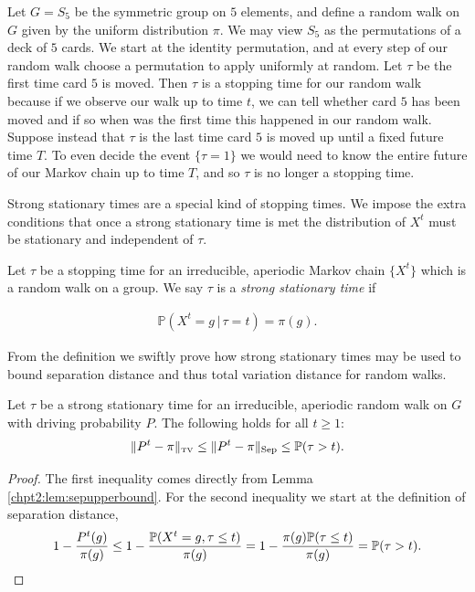 \documentclass[11pt]{report}
\begin{document}
\begin{example}
	Let $G = S_{5}$ be the symmetric group on $5$ elements, and define a random walk on  $G$ given by the uniform distribution $\pi$.  We may view $S_{5}$ as the permutations of a deck of $5$ cards. We start at the identity permutation, and at every step of our random walk choose a permutation to apply uniformly at random. 
	Let $\tau$ be the first time card $5$ is moved. Then 
	$\tau$ is a stopping time for our random walk because if we observe our 
	walk up to time $t$, we can tell whether card $5$ has been moved and if so when was the first time this happened in our random walk.
	Suppose instead that $\tau$ is the last time card $5$ is moved up until a 
	fixed future time $T$. To even decide the event $\{\tau=1\}$ we would need to know the entire future of our Markov chain up to time $T$, and so $\tau$ is no longer a stopping time.
\end{example}

Strong stationary times are a special kind of stopping times. We impose the extra conditions that once a strong stationary time is met the distribution of $X^{t}$ must be stationary and independent of $\tau$.

\begin{defn}
	\label{chpt2:def:sst}
	Let $\tau$ be a stopping time for an irreducible, aperiodic Markov chain 
	$\{X^{t}\}$ which is a random walk on a group. We say $\tau$ is a 
	\emph{strong stationary time} if 
	
	
	
	\begin{eqnarray}
	\mathbb{P}(X^{t} = g \, | \, \tau =t) = \pi(g).
	\end{eqnarray}
\end{defn}

From the definition we swiftly prove how strong stationary 
times may 
be used to bound separation distance and thus total variation distance for random walks.
\begin{lemma}
	\label{chpt2:lem:sst}
	Let $\tau$ be a strong stationary time for an irreducible, aperiodic random 
	walk on $G$ with driving probability $P$. The following holds for all $t\geq 1$:
	\[\lVert P^{t} -\pi \rVert_{\textnormal{\tiny TV}} \leq \lVert P^{t} -\pi 
	\rVert_{\textnormal{Sep}} \leq \mathbb{P}(\tau>t).\]
\end{lemma}
\begin{proof}
	The first inequality comes directly from Lemma 
	\ref{chpt2:lem:sepupperbound}. For the second inequality we start at the 
	definition of separation distance,
	\[1 -\frac{P^{t}(g)}{\pi(g)} \leq 1 -\frac{\mathbb{P}(X^{t}=g, \tau \leq 
		t)}{\pi(g)} = 1 -\frac{\pi(g)\mathbb{P}(\tau \leq 
		t)}{\pi(g)} = \mathbb{P}(\tau >t) \qedhere .\]
\end{proof}
\end{document}

